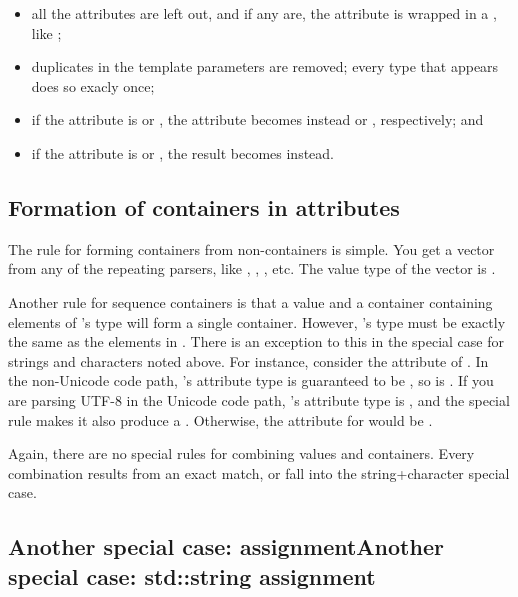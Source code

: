 \documentclass{MyBook}
\begin{document}
\begin{itemize}
\item
  all the  attributes are left out, and if any are, the attribute is wrapped in a , like ;
\item
  duplicates in the  template parameters  are removed; every type that appears does so exacly once;
\item
  if the attribute is  or , the attribute becomes instead  or , respectively; and
\item
  if the attribute is  or , the result becomes  instead.
\end{itemize}

\subsection{Formation of containers in attributes}

The rule for forming containers from non-containers is simple. You get a vector from any of the repeating parsers, like , , , etc. The value type of the vector is \emph{}.

Another rule for sequence containers is that a value  and a container  containing elements of 's type will form a single container. However, 's type must be exactly the same as the elements in . There is an exception to this in the special case for strings and characters noted above. For instance, consider the attribute of . In the non-Unicode code path, 's attribute type is guaranteed to be , so \emph{} is . If you are parsing UTF-8 in the Unicode code path, 's attribute type is , and the special rule makes it also produce a . Otherwise, the attribute for \emph{} would be .

Again, there are no special rules for combining values and containers. Every combination results from an exact match, or fall into the string+character special case.

\subsection{{Another special case:  assignment}{Another special case: std::string assignment}}
\end{document}
